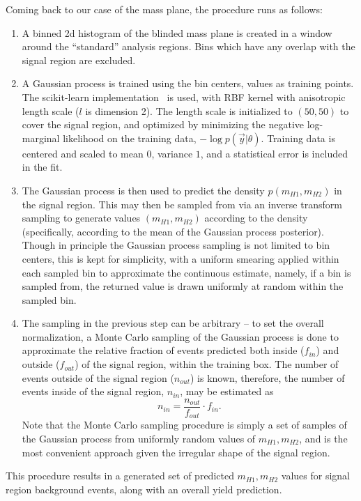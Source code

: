 Coming back to our case of the mass plane, the procedure runs as follows:
\begin{enumerate}
	\item A binned 2d histogram of the blinded mass plane is created in a window 
	around the ``standard'' analysis regions. Bins which have any overlap with the 
	signal region are excluded.
	\item A Gaussian process is trained using the bin centers, values as training points. 
	The scikit-learn implementation~\cite{scikit-learn} is used, with RBF kernel with anisotropic length scale 
	($l$ is dimension 2).  The length scale is initialized to $(50, 50)$ to cover the signal region, 
	and optimized by minimizing the negative log-marginal likelihood on the training data, 
	$-\log p(\vec{y}|\theta)$. Training data is centered and scaled to mean $0$, variance $1$, 
	and a statistical error is included in the fit.
	\item The Gaussian process is then used to predict the density $p(m_{H1}, m_{H2})$ in the signal region. 
	This may then be sampled from via an inverse transform sampling to generate values $(m_{H1}, m_{H2})$ 
	according to the density (specifically, according to the mean of the Gaussian process posterior). 
	Though in principle the Gaussian process sampling is not limited 
	to bin centers, this is kept for simplicity, with a uniform smearing applied within each 
	sampled bin to approximate the continuous estimate, namely, if a bin is sampled from, the 
	returned value is drawn uniformly at random within the sampled bin. 
	\item The sampling in the previous step can be arbitrary -- to set the overall normalization, 
	a Monte Carlo sampling of the Gaussian process is done to approximate the relative fraction 
	of events predicted both inside ($f_{in}$) and outside ($f_{out}$) of the signal region, within 
	the training box. The number of events outside of the signal region ($n_{out}$) is known, therefore, 
	the number of events inside of the signal region, $n_{in}$, may be estimated as 
	\begin{equation}
	n_{in} = \frac{n_{out}}{f_{out}}\cdot f_{in}.
	\end{equation}
	Note that the Monte Carlo sampling procedure is simply a set of samples of the Gaussian 
	process from uniformly random values of $m_{H1}, m_{H2}$, and is the most convenient 
	approach given the irregular shape of the signal region.
\end{enumerate}
This procedure results in a generated set of predicted $m_{H1}, m_{H2}$ values for signal region
background events, along with an overall yield prediction.

